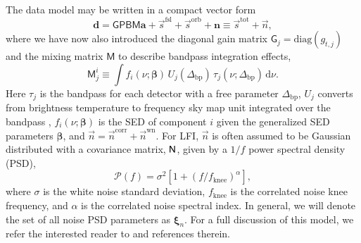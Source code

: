 \documentclass[twocolumn]{aa}
\newcommand{\n}[0]{\vec{n}}
\newcommand{\s}[0]{\vec{s}}
\newcommand{\N}[0]{\tens{N}}
\begin{document}
The data model may be written
in a compact vector form
\begin{equation}
	\boldsymbol d=\mathsf{GPBM}\boldsymbol a+\s^{\mathrm{fsl}} +
        \s^{\mathrm{orb}} + \boldsymbol n \equiv \s^{\mathrm{tot}} + \n, 
        \label{eq:vecmodel}
\end{equation}
where we have now also introduced the diagonal gain matrix ${\mathsf G_j=\mathrm{diag}(g_{t,j})}$ and the mixing matrix $\mathsf M$ to
describe bandpass integration effects,
\begin{equation}
	\mathsf M_j^i\equiv \int
	f_i(\nu;\boldsymbol\beta)\,U_j(\Delta_\mathrm{bp})\,\tau_j(\nu; \Delta_{\mathrm{bp}})\,\mathrm d\nu.
        \label{eq:mixmat}
\end{equation}
Here $\tau_j$ is the bandpass for each detector with a free parameter
$\Delta_{\mathrm{bp}}$, $U_j$ converts from brightness temperature to frequency
sky map unit integrated over the bandpass \citep{planck2013-p03d},
$f_i(\nu;\boldsymbol\beta)$ is the SED of component $i$ given the generalized
SED parameters $\boldsymbol\beta$, and ${\n = \n^{\mathrm{corr}} +
\n^{\mathrm{wn}}}$. For LFI, $\n$ is often assumed to be Gaussian distributed
with a covariance matrix, $\N$, given by a $1/f$ power spectral density (PSD), 
\begin{equation}
	\mathcal P(f) =
\sigma^2[1+(f/f_{\mathrm{knee}})^\alpha],
	\label{eq:psd}
\end{equation}
where $\sigma$ is the white noise standard deviation, $f_{\mathrm{knee}}$ is
the correlated noise knee frequency, and $\alpha$ is the correlated noise
spectral index. In general, we will denote the set of all noise PSD parameters
as $\boldsymbol\xi_n$. For a full discussion of
this model, we refer the interested reader to \citet{bp01} and references
therein.
\end{document}

